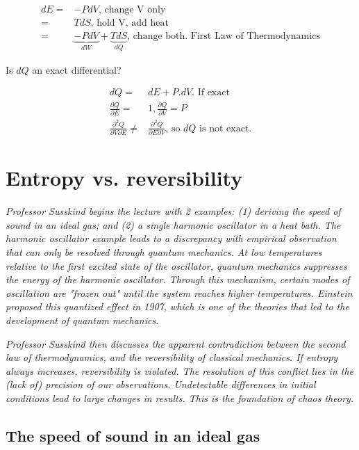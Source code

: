 \documentclass[]{article}
\begin{document}
\begin{align*}
dE =& -P dV \text{, change V only}\\
=& T dS \text{, hold V, add heat}\\
=& \underbrace{-P dV}_{dW} + \underbrace{T dS}_{dQ}\text {, change both. First Law of Thermodynamics}
\end{align*}

Is $dQ$ an exact differential?

\begin{align*}
dQ =& dE + P.dV\text{. If exact}\\
\frac{\partial Q}{\partial E}=&1, \frac{\partial Q}{\partial V} = P\\
\frac{\partial^2 Q}{\partial V \partial E} \ne& \frac{\partial^2 Q}{\partial E \partial V}\text{, so $dQ$ is not exact.}
\end{align*}

\section{Entropy vs. reversibility}

\textit{Professor Susskind begins the lecture with 2 examples: (1) deriving the speed of sound in an ideal  gas; and (2) a single harmonic oscillator in a heat bath.  The harmonic oscillator example leads to a discrepancy with empirical observation that can only be resolved through quantum mechanics.  At low temperatures relative to the first excited state of the oscillator, quantum mechanics suppresses the energy of the harmonic oscillator.  Through this mechanism, certain modes of oscillation are "frozen out" until the system reaches higher temperatures.  Einstein proposed this quantized effect in 1907, which is one of the theories that led to the development of quantum mechanics.}

\textit{Professor Susskind then discusses the apparent contradiction between the second law of thermodynamics, and the reversibility of classical mechanics.  If entropy always increases, reversibility is violated.  The resolution of this conflict lies in the (lack of) precision of our observations.  Undetectable differences in initial conditions lead to large changes in results.  This is the foundation of chaos theory.}

\subsection{The speed of sound in an ideal gas}
\end{document}
